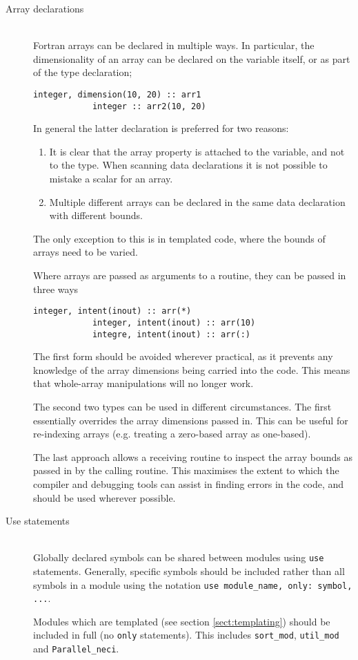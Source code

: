 \documentclass[a4paper,notitlepage]{scrreprt}
\newcommand\headitem[1]{\needspace{1.5\baselineskip}\item[{\boldmath #1 \nopagebreak}] \hfill \\ \nopagebreak}
\let\code\lstinline
\begin{document}
\begin{description}
	\headitem{Array declarations}
		Fortran arrays can be declared in multiple ways. In particular, the
		dimensionality of an array can be declared on the variable itself,
		or as part of the type declaration;
		\begin{lstlisting}[gobble=8]
			integer, dimension(10, 20) :: arr1
			integer :: arr2(10, 20)
		\end{lstlisting}
		In general the latter declaration is preferred for two reasons:
		\begin{enumerate}
			\item
				It is clear that the array property is attached to the
				variable, and not to the type. When scanning data declarations
				it is not possible to mistake a scalar for an array.
			\item
				Multiple different arrays can be declared in the same data
				declaration with different bounds.
		\end{enumerate}
		The only exception to this is in templated code, where the bounds of
		arrays need to be varied.

		Where arrays are passed as arguments to a routine, they can be
		passed in three ways
		\begin{lstlisting}[gobble=8]
			integer, intent(inout) :: arr(*)
			integer, intent(inout) :: arr(10)
			integre, intent(inout) :: arr(:)
		\end{lstlisting}
		The first form should be avoided wherever practical, as it prevents
		any knowledge of the array dimensions being carried into the code.
		This means that whole-array manipulations will no longer work.

		The second two types can be used in different circumstances. The first
		essentially overrides the array dimensions passed in. This can be
		useful for re-indexing arrays (e.g. treating a zero-based array as
		one-based).

		The last approach allows a receiving routine to inspect the array
		bounds as passed in by the calling routine. This maximises the extent
		to which the compiler and debugging tools can assist in finding
		errors in the code, and should be used wherever possible.

	\headitem{Use statements}
		Globally declared symbols can be shared between modules using
		\code{use} statements. Generally, specific symbols should be
		included rather than all symbols in a module using the notation
		\code{use module_name, only: symbol, ...}.

		Modules which are templated (see section \ref{sect:templating}) should
		be included in full (no \code{only} statements). This includes
		\code{sort_mod}, \code{util_mod} and
		\code{Parallel_neci}.


\end{description}
\end{document}
